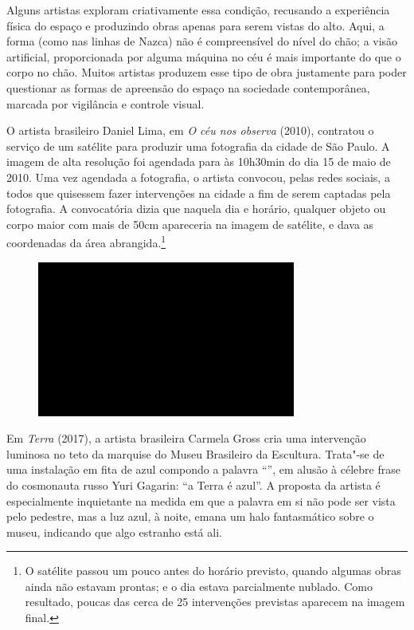 Alguns artistas exploram criativamente essa condição, recusando a
experiência física do espaço e produzindo obras apenas para serem vistas
do alto. Aqui, a forma (como nas linhas de Nazca) não é compreensível do
nível do chão; a visão artificial, proporcionada por alguma máquina no
céu é mais importante do que o corpo no chão. Muitos artistas produzem
esse tipo de obra justamente para poder questionar as formas de
apreensão do espaço na sociedade contemporânea, marcada por vigilância e
controle visual.

O artista brasileiro Daniel Lima, em \emph{O céu nos observa} (2010),
contratou o serviço de um satélite para produzir uma fotografia da
cidade de São Paulo. A imagem de alta resolução foi agendada para às
10h30min do dia 15 de maio de 2010. Uma vez agendada a fotografia, o
artista convocou, pelas redes sociais, a todos que quisessem fazer
intervenções na cidade a fim de serem captadas pela fotografia. A
convocatória dizia que naquela dia e horário, qualquer objeto ou corpo
maior com mais de 50cm apareceria na imagem de satélite, e dava as
coordenadas da área abrangida.\footnote{O satélite passou um pouco antes
  do horário previsto, quando algumas obras ainda não estavam prontas; e
  o dia estava parcialmente nublado. Como resultado, poucas das cerca de
  25 intervenções previstas aparecem na imagem final.}

\begin{figure}[!ht]

\centering
 \includegraphics[width=85mm]{./imgs/im1.jpg}
\caption{\tiny{}}

\end{figure}

Em \emph{Terra} (2017), a artista brasileira Carmela Gross cria uma
intervenção luminosa no teto da marquise do Museu Brasileiro da
Escultura. Trata"-se de uma instalação em fita de  azul compondo a
palavra ``'', em alusão à célebre frase do cosmonauta russo Yuri
Gagarin: ``a Terra é azul''. A proposta da artista é especialmente
inquietante na medida em que a palavra em si não pode ser vista pelo
pedestre, mas a luz azul, à noite, emana um halo fantasmático sobre o
museu, indicando que algo estranho está ali.

